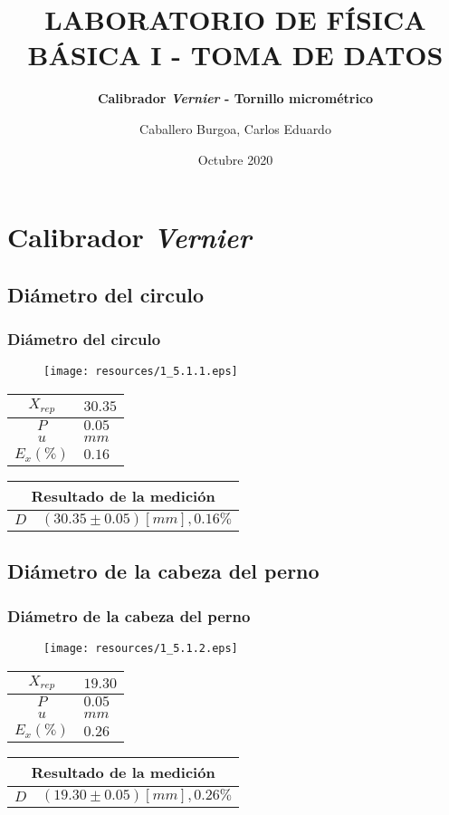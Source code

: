 \documentclass[letter,11pt]{beamer}
\title{\textbf{LABORATORIO DE FÍSICA BÁSICA I - TOMA DE DATOS}}
\subtitle{\textbf{Calibrador \emph{Vernier} - Tornillo micrométrico}}
\author{\small{Caballero Burgoa, Carlos Eduardo}}
\date{\tiny{Octubre 2020}}
\begin{document}
\begin{frame}
\titlepage
\end{frame}

\section{Calibrador \emph{Vernier}}

\subsection{Diámetro del circulo}
\begin{frame}
\frametitle{Diámetro del circulo}
\vspace*{0.8cm}
\begin{figure}
\centering
\texttt{[image: resources/1\_5.1.1.eps]}
\end{figure}
\vspace*{0.4cm}
\scriptsize
\begin{tabular}{|c|>{\centering}m{1.8cm}<{\centering}|}
\hline
$X_{rep}$ &  $30.35$ \tabularnewline \hline
      $P$ &   $0.05$ \tabularnewline \hline
      $u$ &     $mm$ \tabularnewline \hline
$E_x(\%)$ &   $0.16$ \tabularnewline \hline
\end{tabular}
\quad
\begin{tabular}{|c|>{\centering}m{5.7cm}<{\centering}|}
\hline
\multicolumn{2}{|c|}{\textbf{Resultado de la medición}} \\ \hline
$D$ & $( 30.35\pm0.05)[mm], 0.16\%$ \tabularnewline \hline
\end{tabular}
\end{frame}

\subsection{Diámetro de la cabeza del perno}
\begin{frame}
\frametitle{Diámetro de la cabeza del perno}
\vspace*{0.8cm}
\begin{figure}
\centering
\texttt{[image: resources/1\_5.1.2.eps]}
\end{figure}
\vspace*{0.4cm}
\scriptsize
\begin{tabular}{|c|>{\centering}m{1.8cm}<{\centering}|}
\hline
$X_{rep}$ &  $19.30$ \tabularnewline \hline
      $P$ &   $0.05$ \tabularnewline \hline
      $u$ &     $mm$ \tabularnewline \hline
$E_x(\%)$ &   $0.26$ \tabularnewline \hline
\end{tabular}
\quad
\begin{tabular}{|c|>{\centering}m{5.7cm}<{\centering}|}
\hline
\multicolumn{2}{|c|}{\textbf{Resultado de la medición}} \\ \hline
$D$ & $( 19.30\pm0.05)[mm], 0.26\%$ \tabularnewline \hline
\end{tabular}
\end{frame}
\end{document}
